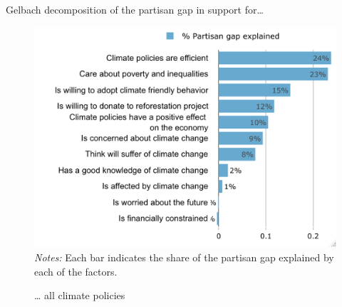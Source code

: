 \begin{frame}{Gelbach decomposition of the partisan gap in support for…}%
\vspace{-.2cm}
\begin{figure}[h!]
\caption{… all climate policies}
\includegraphics[width=.65\textwidth]{../../figures/Gelbach/gelbach_right_all_policies_D2SD_small} \\
{\tiny \textit{Notes:} Each bar indicates the share of the partisan gap explained by each of the factors.}
\end{figure}
\end{frame}

